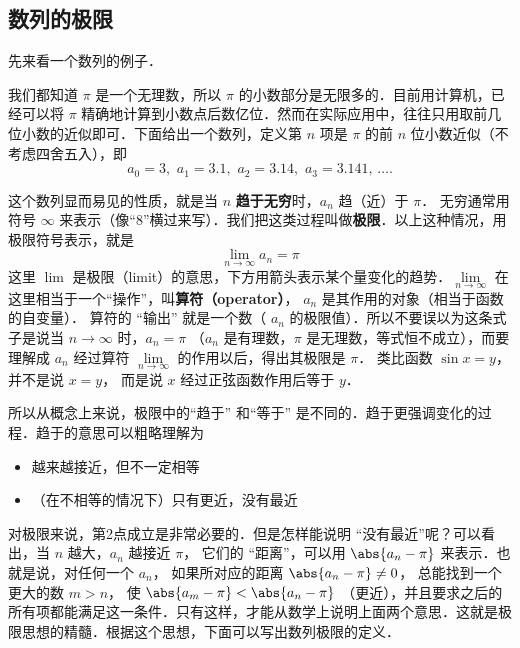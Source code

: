 
\subsection{数列的极限}
先来看一个数列的例子．

\begin{example}{}
我们都知道 $\pi$ 是一个无理数，所以 $\pi$ 的小数部分是无限多的．目前用计算机，已经可以将 $\pi$ 精确地计算到小数点后数亿位．然而在实际应用中，往往只用取前几位小数的近似即可．下面给出一个数列，定义第 $n$ 项是 $\pi$ 的前 $n$ 位小数近似（不考虑四舍五入），即
\begin{equation}
a_0 = 3,\,\, a_1 = 3.1,\,\, a_2 = 3.14,\,\, a_3 = 3.141,\,\dots.
\end{equation}
\end{example}

这个数列显而易见的性质，就是当 $n$ \textbf{趋于无穷}时，$a_n$ 趋（近）于 $\pi$． 无穷通常用符号 $\infty$ 来表示（像“8”横过来写）．我们把这类过程叫做\textbf{极限}．以上这种情况，用极限符号表示，就是
\begin{equation}
\lim_{n \to \infty } {a_n} = \pi 
\end{equation}
这里 $\lim$ 是极限（limit）的意思，下方用箭头表示某个量变化的趋势．$\lim\limits_{n \to \infty }$ 在这里相当于一个“操作”，叫\textbf{算符（operator）}， $a_n$ 是其作用的对象（相当于函数的自变量）． 算符的 “输出” 就是一个数（ $a_n$ 的极限值）．所以不要误以为这条式子是说当 $n \to \infty$ 时，$a_n=\pi$ （$a_n$ 是有理数，$\pi$ 是无理数，等式恒不成立），而要理解成 $a_n$ 经过算符 $\lim\limits_{n \to \infty }$ 的作用以后，得出其极限是 $\pi$． 类比函数 $\sin x = y$，并不是说 $x=y$， 而是说 $x$ 经过正弦函数作用后等于 $y$． 

所以从概念上来说，极限中的“趋于” 和“等于” 是不同的．趋于更强调变化的过程．趋于的意思可以粗略理解为
\begin{itemize}
\item 越来越接近，但不一定相等
\item （在不相等的情况下）只有更近，没有最近
\end{itemize}

对极限来说，第2点成立是非常必要的．但是怎样能说明 “没有最近”呢？可以看出，当 $n$ 越大，$a_n$ 越接近 $\pi$， 它们的 “距离”，可以用 $\abs{a_n - \pi}$ 来表示．也就是说，对任何一个 $a_n$， 如果所对应的距离 $\abs{a_n - \pi } \ne 0$， 总能找到一个更大的数 $m>n$， 使 $\abs{a_m - \pi} < \abs{a_n - \pi}$ （更近），并且要求之后的所有项都能满足这一条件．只有这样，才能从数学上说明上面两个意思．这就是极限思想的精髓．根据这个思想，下面可以写出数列极限的定义．

